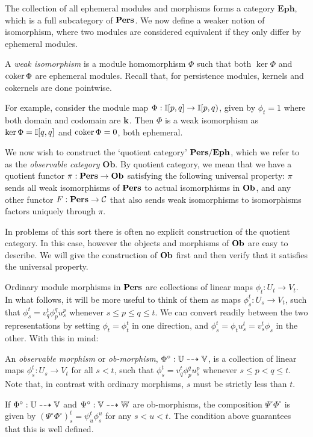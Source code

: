 The collection of all ephemeral modules and morphisms forms a category $\mathbf{Eph}$, which is a full subcategory of $\mathbf{Pers}$. We now define a weaker notion of isomorphism, where two modules are considered equivalent if they only differ by ephemeral modules.

\begin{definition}
A \emph{weak isomorphism} is a module homomorphism $\Phi$ such that both $\ker \Phi$ and $\operatorname{coker} \Phi$ are ephemeral modules. Recall that, for persistence modules, kernels and cokernels are done pointwise.
\end{definition}

For example, consider the module map $\Phi : \mathbb{I}[p, q] \to \mathbb{I}[p, q)$, given by $\phi_t = 1$ where both domain and codomain are $\mathbf{k}$. Then $\Phi$ is a weak isomorphism as $\ker \Phi = \mathbb{I}[q,q] $ and $\operatorname{coker} \Phi = 0$, both ephemeral.

We now wish to construct the `quotient category' $\mathbf{Pers} / \mathbf{Eph}$, which we refer to as the \emph{observable category} $\mathbf{Ob}$. By quotient category, we mean that we have a quotient functor $\pi : \mathbf{Pers} \to \mathbf{Ob}$ satisfying the following universal property: $\pi$ sends all weak isomorphisms of $\mathbf{Pers}$ to actual isomorphisms in $\mathbf{Ob}$, and any other functor $
F : \mathbf{Pers} \to \mathcal{C}$ that also sends weak isomorphisms to isomorphisms factors uniquely through $\pi$.

In problems of this sort there is often no explicit construction of the quotient category. In this case, however the objects and morphisms of $\mathbf{Ob}$ are easy to describe. We will give the construction of $\mathbf{Ob}$ first and then verify that it satisfies the universal property.

Ordinary module morphisms in $\mathbf{Pers}$ are collections of linear maps $\phi_t : U_t \to V_t$. In what follows, it will be more useful to think of them as maps $\phi_s^t : U_s \to V_t$, such that $\phi_s^t = v_q^t \phi_p^q u_s^p$ whenever $s \leq p \leq q \leq t$. We can convert readily between the two representations by setting $\phi_t = \phi_t^t$ in one direction, and $\phi_s^t = \phi_t u_s^t = v_s^t \phi_s$ in the other. With this in mind:

\begin{definition}
An \emph{observable morphism} or \emph{ob-morphism}, $\Phi^\circ : \mathbb{U} \dashrightarrow \mathbb{V}$, is a collection of linear maps $\phi_s^t : U_s \to V_t$ for all $s < t$, such that $\phi_s^t = v_q^t \phi_p^q u_s^p$ whenever $s \leq p < q \leq t$. Note that, in contrast with ordinary morphisms, $s$ must be strictly less than $t$.

If $\Phi^\circ : \mathbb{U} \dashrightarrow \mathbb{V}$ and $\Psi^\circ : \mathbb{V} \dashrightarrow \mathbb{W}$ are ob-morphisms, the composition $\Psi^\circ \Phi^\circ$ is given by $(\Psi^\circ \Phi^\circ)_s^t = \psi_u^t \phi_s^u$ for any $s < u < t$. The condition above guarantees that this is well defined.
\end{definition}

